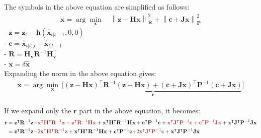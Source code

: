 \documentclass[10pt]{article}
\begin{document}
The symbols in the above equation are simplified as follows:
\begin{equation*}  \begin{aligned}  
		\mathbf{x}
		= \arg\min_{\mathbf{x}} \quad \left\| \mathbf{z} - \mathbf{H}\mathbf{x} \right\|^{2}_{\mathbf{R}} + \left\| \mathbf{c} + \mathbf{J}\mathbf{x} \right\|^{2}_{\mathbf{P}}  
	\end{aligned}  
\end{equation*}
- $\mathbf{z} = \mathbf{z}_{t} - \mathbf{h}(\hat{\mathbf{x}}_{t|t-1}, 0, 0)$\\
- $\mathbf{c} = \hat{\mathbf{x}}_{t|t,j} - \hat{\mathbf{x}}_{t|t-1}$\\
- $\mathbf{R} = \mathbf{H}_{\mathbf{v}}\mathbf{R}^{-1}\mathbf{H}_{\mathbf{v}}^{\intercal}$\\
- $\mathbf{x} = \delta \hat{\mathbf{x}}$\\

Expanding the norm in the above equation gives:
\begin{equation*}  \begin{aligned}  
		\mathbf{x} = \arg\min_{\mathbf{x}} \ \bigg[ \underbrace{ (\mathbf{z} - \mathbf{H}\mathbf{x})^{\intercal}\mathbf{R}^{-1}(\mathbf{z} - \mathbf{H}\mathbf{x}) + (\mathbf{c} + \mathbf{J}\mathbf{x})^{\intercal}\mathbf{P}^{-1}(\mathbf{c} + \mathbf{J}\mathbf{x}) }_{\mathbf{r}} \bigg]
	\end{aligned}  
\end{equation*}


If we expand only the $\mathbf{r}$ part in the above equation, it becomes:
\begin{equation} 
	\begin{aligned} 
		\mathbf{r} & = \mathbf{z}^{\intercal}\mathbf{R}^{-1}\mathbf{z} {\color{Mahogany} - \mathbf{x}^{\intercal}\mathbf{H}^{\intercal}\mathbf{R}^{-1}\mathbf{z}- \mathbf{z}^{\intercal}\mathbf{R}^{-1}\mathbf{H}\mathbf{x} } + \mathbf{x}^{\intercal}\mathbf{H}^{\intercal}\mathbf{R}^{-1}\mathbf{H}\mathbf{x} + \mathbf{c}^{\intercal}\mathbf{P}^{-1}\mathbf{c} + {\color{Mahogany} \mathbf{x}^{\intercal}\mathbf{J}^{\intercal}\mathbf{P}^{-1}\mathbf{c} + \mathbf{c}^{\intercal}\mathbf{P}^{-1}\mathbf{J}\mathbf{x} } + \mathbf{x}^{\intercal}\mathbf{J}^{\intercal}\mathbf{P}^{-1}\mathbf{J}\mathbf{x} \\
		& = \mathbf{z}^{\intercal}\mathbf{R}^{-1}\mathbf{z} {\color{Mahogany} - 2\mathbf{x}^{\intercal}\mathbf{H}^{\intercal}\mathbf{R}^{-1}\mathbf{z} } + \mathbf{x}^{\intercal}\mathbf{H}^{\intercal}\mathbf{R}^{-1}\mathbf{H}\mathbf{x} + \mathbf{c}^{\intercal}\mathbf{P}^{-1}\mathbf{c} {\color{Mahogany} + 2\mathbf{x}^{\intercal}\mathbf{J}^{\intercal}\mathbf{P}^{-1}\mathbf{c} } + \mathbf{x}^{\intercal}\mathbf{J}^{\intercal}\mathbf{P}^{-1}\mathbf{J}\mathbf{x}
	\end{aligned} 
\end{equation}
\end{document}
